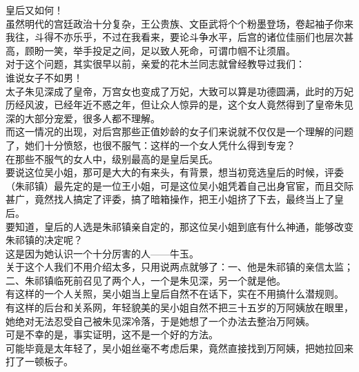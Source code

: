 \begin{multicols}{\theparacolNo}
皇后又如何！\\

虽然明代的宫廷政治十分复杂，王公贵族、文臣武将个个粉墨登场，卷起袖子你来我往，斗得不亦乐乎，不过在我看来，要论斗争水平，后宫的诸位佳丽们也层次甚高，顾盼一笑，举手投足之间，足以致人死命，可谓巾帼不让须眉。\\

对于这个问题，其实很早以前，亲爱的花木兰同志就曾经教导过我们：\\

谁说女子不如男！\\

太子朱见深成了皇帝，万宫女也变成了万妃，大致可以算是功德圆满，此时的万妃历经风波，已经年近不惑之年，但让众人惊异的是，这个女人竟然得到了皇帝朱见深的大部分宠爱，很多人都不理解。\\

而这一情况的出现，对后宫那些正值妙龄的女子们来说就不仅仅是一个理解的问题了，她们十分愤怒，也很不服气：这样的一个女人凭什么得到专宠？\\

在那些不服气的女人中，级别最高的是皇后吴氏。\\

要说这位吴小姐，那可是大大的有来头，有背景，想当初竞选皇后的时候，评委（朱祁镇）最先定的是一位王小姐，可是这位吴小姐凭着自己出身官宦，而且交际甚广，竟然找人搞定了评委，搞了暗箱操作，把王小姐挤了下去，最终当上了皇后。\\

要知道，皇后的人选是朱祁镇亲自定的，那这位吴小姐到底有什么神通，能够改变朱祁镇的决定呢？\\

这是因为她认识一个十分厉害的人——牛玉。\\

关于这个人我们不用介绍太多，只用说两点就够了：一、他是朱祁镇的亲信太监；二、朱祁镇临死前召见了两个人，一个是朱见深，另一个就是他。\\

有这样的一个人关照，吴小姐当上皇后自然不在话下，实在不用搞什么潜规则。\\

有这样的后台和关系网，年轻貌美的吴小姐自然不把三十五岁的万阿姨放在眼里，她绝对无法忍受自己被朱见深冷落，于是她想了一个办法去整治万阿姨。\\

可是不幸的是，事实证明，这不是一个好的方法。\\

可能毕竟是太年轻了，吴小姐丝毫不考虑后果，竟然直接找到万阿姨，把她拉回来打了一顿板子。\\


\end{multicols}
